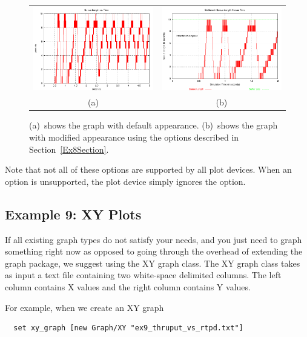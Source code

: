 \documentclass[11pt]{article}
\begin{document}
\begin{figure}
\begin{tabular}{cc}
\includegraphics[width=3in]{qlen_vs_time0_plot1} &
\includegraphics[width=3in]{qlen_vs_time0_plot2} \\
(a) & (b) \\
\end{tabular}
\caption{(a)~shows the graph with default appearance.  (b)~shows the graph
  with modified appearance using the options described in 
  Section~\ref{Ex8Section}.}\label{Ex8Graph}

\end{figure}

Note that not all of these options are supported by all plot devices.
When an option is unsupported, the plot device simply ignores the
option.

\subsection{Example 9: XY Plots}

If all existing graph types do not satisfy your needs, and you just
need to graph something right now as opposed to going through the
overhead of extending the graph package, we suggest using the XY graph
class.  The XY graph class takes as input a text file containing two
white-space delimited columns.  The left column contains X values and
the right column contains Y values.  

For example, when we create an XY graph
\begin{verbatim}
  set xy_graph [new Graph/XY "ex9_thruput_vs_rtpd.txt"]
\end{verbatim}
\end{document}
